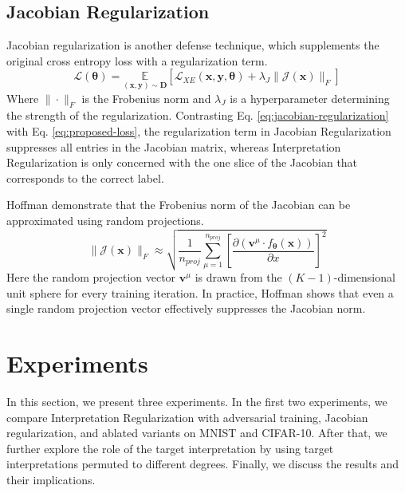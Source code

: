 \subsection{Jacobian Regularization}
Jacobian regularization \cite{jacobian_reg} is another defense technique, which supplements the original cross entropy loss with a regularization term. 
\begin{equation} \label{eq:jacobian-regularization}
    \mathcal{L}(\bm{\theta}) = \underset{(\bm{x},\bm{y}) \sim \mathbf{D}} {\mathbb{E}} 
\left[  
\mathcal{L}_{XE}(\bm{x},\bm{y}, \bm{\theta}) + \lambda_J \| \mathcal{J}(\bm x) \|_F \right]
\end{equation}
Where $\| \cdot \|_F$ is the Frobenius norm and $\lambda_J$ is a hyperparameter determining the strength of the regularization. Contrasting Eq. \ref{eq:jacobian-regularization} with Eq. \ref{eq:proposed-loss}, the regularization term in Jacobian Regularization suppresses all entries in the Jacobian matrix, whereas Interpretation Regularization is only concerned with the one slice of the Jacobian that corresponds to the correct label. 

Hoffman \etal \cite{jacobian_reg_approx} demonstrate that the Frobenius norm of the Jacobian can be approximated using random projections.
\begin{equation}
    \| \mathcal{J}(\bm x) \|_F \approx \sqrt{ \frac{1}{n_{proj}}\sum_{\mu=1}^{n_{proj}}\left[ \frac{\partial(\bm{v}^\mu \cdot f_{\bm \theta}(\bm x))}{\partial x} \right]^2}
\end{equation}
Here the random projection vector $\bm{v}^\mu$ is drawn from the $(K-1)$-dimensional unit sphere for every training iteration. In practice, Hoffman \etal shows that even a single random projection vector effectively suppresses the Jacobian norm. 


\section{Experiments} \label{sec:experiments}
In this section, we present three experiments. In the first two experiments, we compare Interpretation Regularization with adversarial training, Jacobian regularization, and ablated variants on MNIST and CIFAR-10. After that, we further explore the role of the target interpretation by using target interpretations permuted to different degrees. 
Finally, we discuss the results and their implications. 


